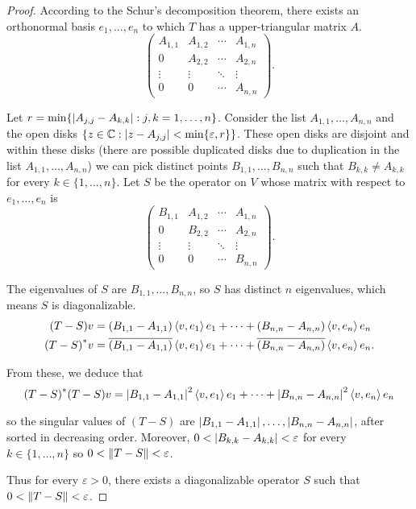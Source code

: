 \begin{proof}
    According to the Schur's decomposition theorem, there exists an orthonormal basis $e_{1}, \ldots, e_{n}$ to which $T$ has a upper-triangular matrix $A$.
    \[
        \begin{pmatrix}
            A_{1,1} & A_{1,2} & \cdots & A_{1,n} \\
            0       & A_{2,2} & \cdots & A_{2,n} \\
            \vdots  & \vdots  & \ddots & \vdots  \\
            0       & 0       & \cdots & A_{n,n}
        \end{pmatrix}.
    \]

    Let $r = \min\{ \left\vert{A_{j,j} - A_{k,k}}\right\vert : j,k=1,\ldots,n \}$. Consider the list $A_{1,1}, \ldots, A_{n,n}$ and the open disks $\{ z\in\mathbb{C} : \left\vert{z - A_{j,j}}\right\vert < \min\{ \varepsilon, r \} \}$. These open disks are disjoint and within these disks (there are possible duplicated disks due to duplication in the list $A_{1,1}, \ldots, A_{n,n}$) we can pick distinct points $B_{1,1}, \ldots, B_{n,n}$ such that $B_{k,k}\ne A_{k,k}$ for every $k\in\{1,\ldots,n\}$. Let $S$ be the operator on $V$ whose matrix with respect to $e_{1}, \ldots, e_{n}$ is
    \[
        \begin{pmatrix}
            B_{1,1} & A_{1,2} & \cdots & A_{1,n} \\
            0       & B_{2,2} & \cdots & A_{2,n} \\
            \vdots  & \vdots  & \ddots & \vdots  \\
            0       & 0       & \cdots & B_{n,n}
        \end{pmatrix}.
    \]

    The eigenvalues of $S$ are $B_{1,1}, \ldots, B_{n,n}$, so $S$ has distinct $n$ eigenvalues, which means $S$ is diagonalizable.
    \begin{align*}
        (T - S)v       & = (B_{1,1} - A_{1,1})\left\langle{v,e_{1}}\right\rangle e_{1} + \cdots + (B_{n,n} - A_{n,n})\left\langle{v,e_{n}}\right\rangle e_{n}                \\
        {(T - S)}^{*}v & = \overline{(B_{1,1} - A_{1,1})}\left\langle{v,e_{1}}\right\rangle e_{1} + \cdots + \overline{(B_{n,n} - A_{n,n})}\left\langle{v,e_{n}}\right\rangle e_{n}.
    \end{align*}

    From these, we deduce that
    \[
        {(T - S)}^{*}(T - S)v = \left\vert{B_{1,1} - A_{1,1}}\right\vert^{2}\left\langle{v,e_{1}}\right\rangle e_{1} + \cdots + \left\vert{B_{n,n} - A_{n,n}}\right\vert^{2}\left\langle{v,e_{n}}\right\rangle e_{n}
    \]

    so the singular values of $(T - S)$ are $\left\vert{B_{1,1} - A_{1,1}}\right\vert, \ldots, \left\vert{B_{n,n} - A_{n,n}}\right\vert$, after sorted in decreasing order. Moreover, $0 < \left\vert{B_{k,k} - A_{k,k}}\right\vert < \varepsilon$ for every $k\in\{ 1,\ldots,n \}$ so $0 < \left\Vert{T - S}\right\Vert < \varepsilon$.

    Thus for every $\varepsilon > 0$, there exists a diagonalizable operator $S$ such that $0 < \left\Vert{T - S}\right\Vert < \varepsilon$.
\end{proof}
\newpage

